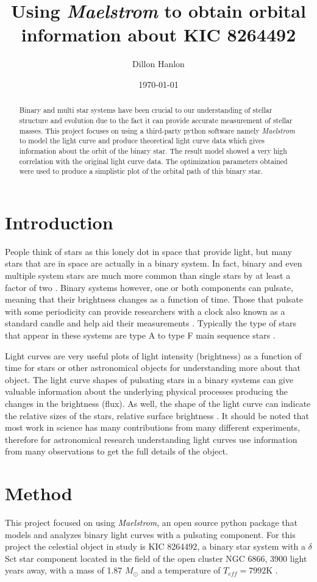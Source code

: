 \documentclass[]{article}
\title{Using \textit{Maelstrom} to obtain orbital information about KIC 8264492 }
\author{Dillon Hanlon}
\date{\today}
\begin{document}
\maketitle
\begin{abstract}
    Binary and multi star systems have been crucial to our understanding of stellar structure and evolution due to the fact it can provide accurate measurement of stellar masses.
    This project focuses on using a third-party python software namely \textit{Maelstrom} to model the light curve and produce theoretical light curve data which gives information about the orbit of the binary star. 
    The result model showed a very high correlation with the original light curve data. The optimization parameters obtained were used to produce a simplistic plot of the orbital path of this binary star. 
\end{abstract}
\section{Introduction}
People think of stars as this lonely dot in space that provide light, but many stars that are in space are actually in a binary system.
In fact, binary and even multiple system stars are much more common than single stars by at least a factor of two \cite{guszejnov2017protostellar}.
Binary systems however, one or both components can pulsate, meaning that their brightness changes as a function of time. 
Those that pulsate with some periodicity can provide researchers with a clock also known as a standard candle and help aid their measurements  \cite{murphy2018finding}. 
Typically the type of stars that appear in these systems are type A to type F main sequence stars \cite{garg2010high}.

Light curves are very useful plots of light intensity (brightness) as a function of time for stars or other astronomical objects for understanding more about that object. 
The light curve shapes of pulsating stars in a binary systems can give valuable information about the underlying physical processes producing the changes in the brightness (flux). 
As well, the shape of the light curve can indicate the relative sizes of the stars, relative surface brightness \cite{russell1912determination}. 
It should be noted that most work in science has many contributions from many different experiments, therefore for astronomical research understanding light curves use information from many observations to get the full details of the object.

\section{Method}
This project focused on using \textit{Maelstrom}, an open source python package that models and analyzes binary light curves with a pulsating component. 
For this project the celestial object in study is KIC 8264492, a binary star system with a $\delta$ Sct star component located in the field of the open cluster NGC 6866, 3900 light years away, with a mass of 1.87 $M_{\odot}$ and a temperature of $T_{eff} = 7992$K \cite{balona2013pulsation,shibahashi2015fm}.
\end{document}
